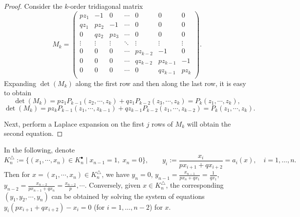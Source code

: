 \documentclass[a4paper,fleqn,numbers]{cas-sc}
\begin{document}
	\begin{proof}
		Consider the \(k\)-order tridiagonal matrix
		\[
		M_k = \begin{pmatrix}
			p z_1 & -1 & 0 & \cdots & 0 & 0 & 0 \\
			q z_1 & p z_2 & -1 & \cdots & 0 & 0 & 0 \\
			0 & q z_2 & p z_3 & \cdots & 0 & 0 & 0 \\
			\vdots & \vdots & \vdots & \ddots & \vdots & \vdots & \vdots \\
			0 & 0 & 0 & \cdots & p z_{k-2} & -1 & 0 \\
			0 & 0 & 0 & \cdots & q z_{k-2} & p z_{k-1} & -1\\
			0 & 0 & 0 & \cdots & 0 & q z_{k-1} & p z_k \\
		\end{pmatrix}.
		\]
		Expanding \(\det(M_k)\) along the first row and then along the last row, it is easy to obtain
		\[
		\det(M_k) = p z_1 P_{k-1}(z_2,\cdots,z_k) + q z_1 P_{k-2}(z_3,\cdots,z_k) = P_k(z_1,\cdots,z_k),
		\]
		\[
		\det(M_k) = p z_k P_{k-1}(z_1,\cdots,z_{k-1}) + q z_{k-1} P_{k-2}(z_1,\cdots,z_{k-2}) = P_k(z_1,\cdots,z_k).
		\]
		
		Next, perform a Laplace expansion on the first \(j\) rows of \(M_k\) will obtain the second equation. 
		
	\end{proof}
	
	In the following, denote
	\[
	K_n^{\triangle} := \{(x_1, \cdots, x_n) \in K_n^{\bullet} \mid x_{n-1}=1,\; x_n=0\},\qquad y_i := \frac{x_i}{p x_{i+1} + q x_{i+2}} = a_i(x), \quad i=1,\ldots,n.
	\]
	Then for \( x=(x_1,\cdots,x_n)\in K_n^{\triangle} \), we have \( y_n=0 \), \( y_{n-1}=\frac{x_{n-1}}{p x_n+q x_1}=\frac{1}{q x_1} \), \( y_{n-2}=\frac{x_{n-2}}{p x_{n-1}+q x_n}=\frac{x_{n-2}}{p},\cdots \). Conversely, given \(x\in K_n^{\triangle}\), the corresponding \((y_1,y_2,\cdots,y_n)\) can be obtained by solving the system of equations \( y_i(p x_{i+1}+q x_{i+2}) - x_i = 0 \) (for \( i=1,\ldots,n-2 \)) for \(x\).
	
\end{document}
